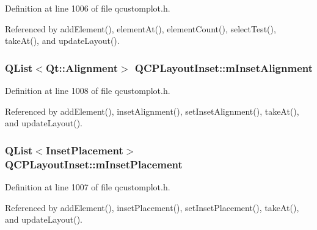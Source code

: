Definition at line 1006 of file qcustomplot.\+h.



Referenced by add\+Element(), element\+At(), element\+Count(), select\+Test(), take\+At(), and update\+Layout().

\hypertarget{class_q_c_p_layout_inset_a55e9b84c310136ff985a6544184ab64a}{}
\subsubsection[{m\+Inset\+Alignment}]{\setlength{\rightskip}{0pt plus 5cm}Q\+List$<$Qt\+::\+Alignment$>$ Q\+C\+P\+Layout\+Inset\+::m\+Inset\+Alignment\hspace{0.3cm}{\ttfamily [protected]}}\label{class_q_c_p_layout_inset_a55e9b84c310136ff985a6544184ab64a}


Definition at line 1008 of file qcustomplot.\+h.



Referenced by add\+Element(), inset\+Alignment(), set\+Inset\+Alignment(), take\+At(), and update\+Layout().

\hypertarget{class_q_c_p_layout_inset_a57a0a4e445cc78eada29765ecf092abe}{}
\subsubsection[{m\+Inset\+Placement}]{\setlength{\rightskip}{0pt plus 5cm}Q\+List$<${\bf Inset\+Placement}$>$ Q\+C\+P\+Layout\+Inset\+::m\+Inset\+Placement\hspace{0.3cm}{\ttfamily [protected]}}\label{class_q_c_p_layout_inset_a57a0a4e445cc78eada29765ecf092abe}


Definition at line 1007 of file qcustomplot.\+h.



Referenced by add\+Element(), inset\+Placement(), set\+Inset\+Placement(), take\+At(), and update\+Layout().

\hypertarget{class_q_c_p_layout_inset_aaa8f6b5029458f3d97a65239524a2b33}{}
